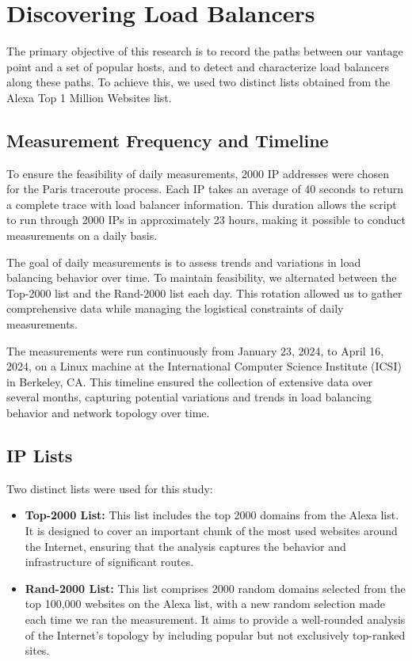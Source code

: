 \documentclass[12pt]{cwru_thesis}
\begin{document}
\section{Discovering Load Balancers}

The primary objective of this research is to record the paths between our vantage point and a set of popular hosts, and to detect and characterize load balancers along these paths. To achieve this, we used two distinct lists obtained from the Alexa Top 1 Million Websites list.

\subsection{Measurement Frequency and Timeline}

To ensure the feasibility of daily measurements, 2000 IP addresses were chosen for the Paris traceroute process. Each IP takes an average of 40 seconds to return a complete trace with load balancer information. This duration allows the script to run through 2000 IPs in approximately 23 hours, making it possible to conduct measurements on a daily basis.

The goal of daily measurements is to assess trends and variations in load balancing behavior over time. To maintain feasibility, we alternated between the Top-2000 list and the Rand-2000 list each day. This rotation allowed us to gather comprehensive data while managing the logistical constraints of daily measurements.

The measurements were run continuously from January 23, 2024, to April 16, 2024, on a Linux machine at the International Computer Science Institute (ICSI) in Berkeley, CA. This timeline ensured the collection of extensive data over several months, capturing potential variations and trends in load balancing behavior and network topology over time.

\subsection{IP Lists}

Two distinct lists were used for this study:
\begin{itemize}
    \item \textbf{Top-2000 List:} This list includes the top 2000 domains from the Alexa list. It is designed to cover an important chunk of the most used websites around the Internet, ensuring that the analysis captures the behavior and infrastructure of significant routes.
    \item \textbf{Rand-2000 List:} This list comprises 2000 random domains selected from the top 100,000 websites on the Alexa list, with a new random selection made each time we ran the measurement. It aims to provide a well-rounded analysis of the Internet's topology by including popular but not exclusively top-ranked sites.
\end{itemize}
\end{document}
